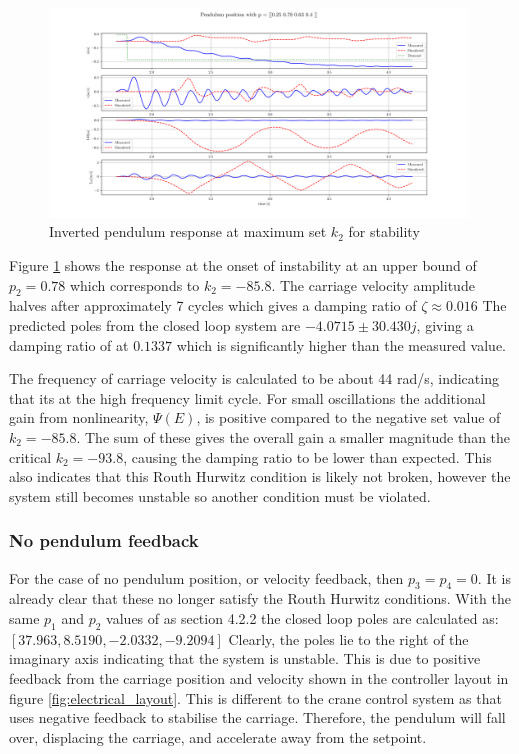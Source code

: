 \documentclass{article}
\begin{document}
\begin{figure}[H]
  \centering
  \includegraphics[width=0.99\textwidth]{figures/4.4_hi.png}
  \caption{Inverted pendulum response at maximum set $k_2$ for stability}
  \label{fig:roots4.4_hi}
\end{figure}

Figure \ref{fig:roots4.4_hi} shows the response at the onset of instability at an upper bound of $p_2 = 0.78$ which corresponds to $k_2 = -85.8$.
The carriage velocity amplitude halves after approximately 7 cycles which gives a damping ratio of $\zeta \approx 0.016$
The predicted poles from the closed loop system are $-4.0715 \pm 30.430j$, giving a damping ratio of at $0.1337$ which is significantly higher than the measured value.

The frequency of carriage velocity is calculated to be about 44 rad/s, indicating that its at the high frequency limit cycle.
For small oscillations the additional gain from nonlinearity, $\Psi(E)$, is positive compared to the negative set value of $k_2 = -85.8$.
The sum of these gives the overall gain a smaller magnitude than the critical $k_2 = -93.8$, causing the damping ratio to be lower than expected.
This also indicates that this Routh Hurwitz condition is likely not broken, however the system still becomes unstable so another condition must be violated.


\subsubsection{No pendulum feedback}

For the case of no pendulum position, or velocity feedback, then $p_3 = p_4 = 0$.
It is already clear that these no longer satisfy the Routh Hurwitz conditions.
With the same $p_1$ and $p_2$ values of as section 4.2.2 the closed loop poles are calculated as: \\
$[37.963,  8.5190, -2.0332, -9.2094]$
Clearly, the poles lie to the right of the imaginary axis indicating that the system is unstable.
This is due to positive feedback from the carriage position and velocity shown in the controller layout in figure \ref{fig:electrical_layout}.
This is different to the crane control system as that uses negative feedback to stabilise the carriage.
Therefore, the pendulum will fall over, displacing the carriage, and accelerate away from the setpoint.
\end{document}
